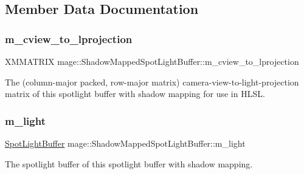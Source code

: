 \subsection{Member Data Documentation}
\hypertarget{structmage_1_1_shadow_mapped_spot_light_buffer_a99a1760604d6fc9605c186baf61cb8d2}{}\label{structmage_1_1_shadow_mapped_spot_light_buffer_a99a1760604d6fc9605c186baf61cb8d2} 
\subsubsection{\texorpdfstring{m\+\_\+cview\+\_\+to\+\_\+lprojection}{m\_cview\_to\_lprojection}}
{\footnotesize\ttfamily X\+M\+M\+A\+T\+R\+IX mage\+::\+Shadow\+Mapped\+Spot\+Light\+Buffer\+::m\+\_\+cview\+\_\+to\+\_\+lprojection}

The (column-\/major packed, row-\/major matrix) camera-\/view-\/to-\/light-\/projection matrix of this spotlight buffer with shadow mapping for use in H\+L\+SL. \hypertarget{structmage_1_1_shadow_mapped_spot_light_buffer_a629e46c0d512d0b31f2467e7a84a2a47}{}\label{structmage_1_1_shadow_mapped_spot_light_buffer_a629e46c0d512d0b31f2467e7a84a2a47} 
\subsubsection{\texorpdfstring{m\+\_\+light}{m\_light}}
{\footnotesize\ttfamily \hyperlink{structmage_1_1_spot_light_buffer}{Spot\+Light\+Buffer} mage\+::\+Shadow\+Mapped\+Spot\+Light\+Buffer\+::m\+\_\+light}

The spotlight buffer of this spotlight buffer with shadow mapping. 
